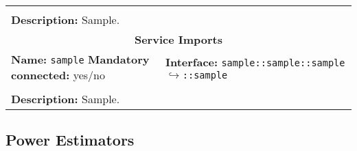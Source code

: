 \begin{center}
\begin{tabular}{|p{7.5cm}|p{7.5cm}|}
		\multicolumn{2}{|l|}{}\\
		\multicolumn{2}{|p{15cm}|}{\textbf{Description:} \newline Sample.}\\
		\hline
		\hline
		\multicolumn{2}{|c|}{\textbf{\large Service Imports}}\\
		\hline
		\multicolumn{1}{|p{7.5cm}}{\textbf{Name:} \texttt{sample} \newline \textbf{Mandatory connected:} yes/no} & \multicolumn{1}{p{7.5cm}|}{\textbf{Interface:} \newline \texttt{sample::sample::sample} \newline$\hookrightarrow$\texttt{::sample}}\\
		\multicolumn{2}{|l|}{}\\
		\multicolumn{2}{|p{15cm}|}{\textbf{Description:} \newline Sample.}\\
		\hline
	\end{tabular}
\end{center}

\subsection{Power Estimators}

